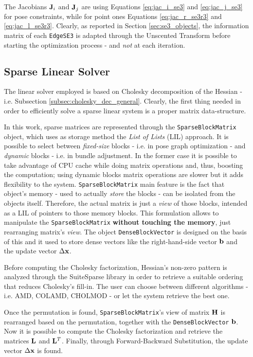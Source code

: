 The Jacobians $\mathbf{J}_i$ and $\mathbf{J}_j$ are using Equations \ref{eq:jac_i_se3} and \ref{eq:jac_j_se3} for pose constraints, while for point ones Equations \ref{eq:jac_r_se3r3} and \ref{eq:jac_l_se3r3}. Clearly, as reported in Section \ref{sec:se3_objects}, the information matrix of each \texttt{EdgeSE3} is adapted through the Unscented Transform before starting the optimization process - and \textit{not} at each iteration.

\subsection{Sparse Linear Solver}\label{subsec:sparse_linear_solver}
The linear solver employed is based on Cholesky decomposition of the Hessian - i.e. Subsection \ref{subsec:cholesky_dec_general}. Clearly, the first thing needed in order to efficiently solve a sparse linear system is a proper matrix data-structure.

In this work, sparse matrices are represented through the \texttt{SparseBlockMatrix} object, which uses as storage method the \textit{List of Lists} (LIL) approach. It is possible to select between \textit{fixed-size} blocks - i.e. in pose graph optimization - and \textit{dynamic} blocks - i.e. in bundle adjustment. In the former case it is possible to take advantage of CPU cache while doing matrix operations and, thus, boosting the computation; using dynamic blocks matrix operations are slower but it adds flexibility to the system. \texttt{SparseBlockMatrix} main feature is the fact that object's memory - used to actually \textit{store} the blocks - can be isolated from the objects itself. Therefore, the actual matrix is just a \textit{view} of those blocks, intended as a LIL of pointers to those memory blocks. This formulation allows to manipulate the \texttt{SparseBlockMatrix} \textbf{without touching the memory}, just rearranging matrix's \textit{view}. The object \texttt{DenseBlockVector} is designed  on the basis of this and it used to store dense vectors like the right-hand-side vector $\mathbf{b}$ and the update vector $\Delta \mathbf{x}$.

Before computing the Cholesky factorization, Hessian's non-zero pattern is analyzed through the SuiteSparse library in order to retrieve a suitable ordering that reduces Cholesky's fill-in. The user can choose between different algorithms - i.e. AMD, COLAMD, CHOLMOD - or let the system retrieve the best one.

Once the permutation is found, \texttt{SparseBlockMatrix}'s view of matrix $\mathbf{H}$ is rearranged based on the permutation, together with the \texttt{DenseBlockVector} $\mathbf{b}$. Now it is possible to compute the Cholesky factorization and retrieve the matrices $\mathbf{L}$ and $\mathbf{L}^T$. Finally, through Forward-Backward Substitution, the update vector $\Delta \mathbf{x}$ is found.


